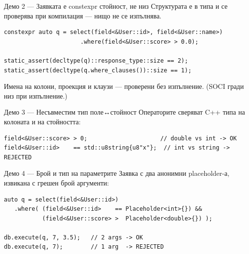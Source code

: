 \documentclass[aspectratio=169,12pt]{beamer}
\begin{document}
\begin{frame}[fragile]{Демо 2 — Заявката е constexpr стойност, не низ}
    {\footnotesize Структурата е в типа и се проверява при компилация --- нищо не се
    изпълнява.}
\begin{lstlisting}[basicstyle=\footnotesize\ttfamily]
constexpr auto q = select(field<&User::id>, field<&User::name>)
                      .where(field<&User::score> > 0.0);

static_assert(decltype(q)::response_type::size == 2);
static_assert(decltype(q.where_clauses())::size == 1);
\end{lstlisting}
    {\scriptsize Имена на колони, проекция и клаузи --- проверени без изпълнение. (SOCI гради низ при изпълнение.)}
\end{frame}

\begin{frame}[fragile]{Демо 3 — Несъвместим тип поле↔стойност}
    {\footnotesize Операторите сверяват C++ типа на колоната и на стойността:}
\begin{lstlisting}[basicstyle=\footnotesize\ttfamily]
field<&User::score> > 0;                     // double vs int -> OK
field<&User::id>    == std::u8string{u8"x"};  // int vs string -> REJECTED
\end{lstlisting}
    
\end{frame}

\begin{frame}[fragile]{Демо 4 — Брой и тип на параметрите}
    {\footnotesize Заявка с два анонимни placeholder-а, извикана с грешен брой аргументи:}
\begin{lstlisting}[basicstyle=\footnotesize\ttfamily]
auto q = select(field<&User::id>)
   .where( (field<&User::id>    == Placeholder<int>{}) &&
           (field<&User::score> >  Placeholder<double>{}) );

db.execute(q, 7, 3.5);   // 2 args -> OK
db.execute(q, 7);        // 1 arg  -> REJECTED
\end{lstlisting}
    
\end{frame}
\end{document}
